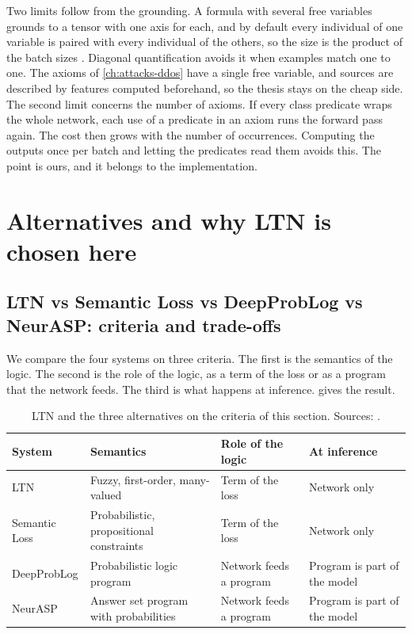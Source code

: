 Two limits follow from the grounding. A formula with several free variables
grounds to a tensor with one axis for each, and by default every individual of
one variable is paired with every individual of the others, so the size is the
product of the batch sizes \citep{badreddine2022ltn}. Diagonal quantification
avoids it when examples match one to one. The axioms of \cref{ch:attacks-ddos}
have a single free variable, and sources are described by features computed
beforehand, so the thesis stays on the cheap side. The second limit concerns the
number of axioms. If every class predicate wraps the whole network, each use of
a predicate in an axiom runs the forward pass again. The cost then grows with
the number of occurrences. Computing the outputs once per batch and letting the
predicates read them avoids this. The point is ours, and it belongs to the
implementation.

\section{Alternatives and why LTN is chosen here}
\label{sec:ltn-alternatives}

\subsection{LTN vs Semantic Loss vs DeepProbLog vs NeurASP: criteria and trade-offs}
\label{sec:ltn-vs-alternatives}

We compare the four systems on three criteria. The first is the semantics of
the logic. The second is the role of the logic, as a term of the loss or as a
program that the network feeds. The third is what happens at inference.
 gives the result.

\begin{table}[htbp]
\centering
\footnotesize
\setlength{\tabcolsep}{3pt}
\caption{LTN and the three alternatives on the criteria of this section.
Sources: \citet{badreddine2022ltn,marra2024statistical,xu2018semantic,%
manhaeve2018deepproblog,yang2020neurasp}.}
\label{tab:ltn-alternatives}
\begin{tabular}{@{}p{2.1cm}p{3.3cm}p{3.5cm}p{3.1cm}@{}}
\toprule
System & Semantics & Role of the logic & At inference \\
\midrule
LTN & Fuzzy, first-order, many-valued & Term of the loss & Network only \\
Semantic Loss & Probabilistic, propositional constraints & Term of the loss & Network only \\
DeepProbLog & Probabilistic logic program & Network feeds a program & Program is part of the model \\
NeurASP & Answer set program with probabilities & Network feeds a program & Program is part of the model \\
\bottomrule
\end{tabular}
\end{table}

